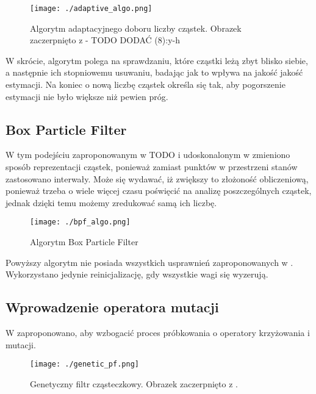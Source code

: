 \documentclass[10pt,a4paper]{article}
\begin{document}
\begin{figure}[H]
	\begin{center}
		\texttt{[image: ./adaptive\_algo.png]}
		\caption{Algorytm adaptacyjnego doboru liczby cząstek. Obrazek zaczerpnięto z\cite{adaptive} - TODO DODAĆ (8):y-h}
	\end{center}
\end{figure}

W skrócie, algorytm polega na sprawdzaniu, które cząstki leżą zbyt blisko siebie, a następnie ich stopniowemu usuwaniu, badając jak to wpływa na jakość jakość estymacji. Na koniec o nową liczbę cząstek określa się tak, aby pogorszenie estymacji nie było większe niż pewien próg.

\subsection{Box Particle Filter}
W tym podejściu zaproponowanym w \cite{bpfln}TODO i udoskonalonym w \cite{brbpf} zmieniono sposób reprezentacji cząstek, ponieważ zamiast punktów w przestrzeni stanów zastosowano interwały. Może się wydawać, iż zwiększy to złożoność obliczeniową, ponieważ trzeba o wiele więcej czasu poświęcić na analizę poszczególnych cząstek, jednak dzięki temu możemy zredukować samą ich liczbę.

\begin{figure}[H]
	\begin{center}
		\texttt{[image: ./bpf\_algo.png]}
		\caption{Algorytm Box Particle Filter}
	\end{center}
\end{figure}

Powyższy algorytm nie posiada wszystkich usprawnień zaproponowanych w \cite{brbpf}. Wykorzystano jedynie reinicjalizację, gdy wszystkie wagi się wyzerują.

\subsection{Wprowadzenie operatora mutacji}
W \cite{pfgen} zaproponowano, aby wzbogacić proces próbkowania o operatory krzyżowania i mutacji.

\begin{figure}[H]
	\begin{center}
		\texttt{[image: ./genetic\_pf.png]}
		\caption{Genetyczny filtr cząsteczkowy. Obrazek zaczerpnięto z \cite{pfgen}.}
	\end{center}
\end{figure}
\end{document}
